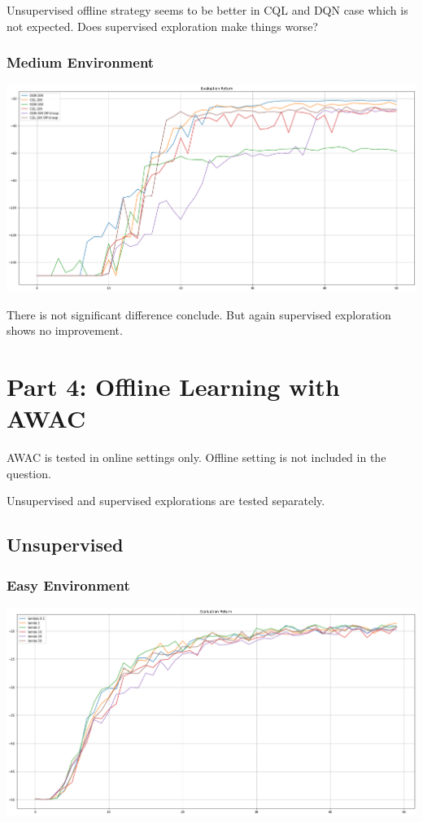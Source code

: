 \documentclass[11pt]{article}
\begin{document}
    Unsupervised offline strategy seems to be better in CQL and DQN case which is not expected.
    Does supervised exploration make things worse?

    \subsubsection{Medium Environment}

    \hspace*{-0.3in}
    \includegraphics[scale=0.30]{q3-offline/medium-eval}

    There is not significant difference conclude.
    But again supervised exploration shows no improvement.


    \section{Part 4: Offline Learning with AWAC}

    AWAC is tested in online settings only.
    Offline setting is not included in the question.

    Unsupervised and supervised explorations are tested separately.

    \subsection{Unsupervised}

    \subsubsection{Easy Environment}

    \hspace*{-0.3in}
    \includegraphics[scale=0.30]{q4/eval-easy-unsupervised}
\end{document}
